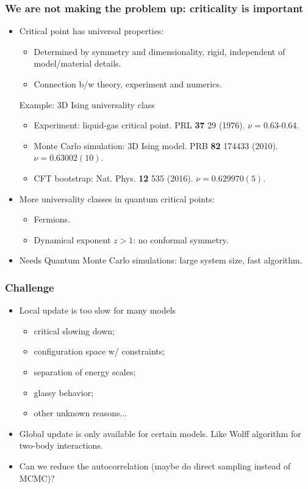 \documentclass[xcolor=table, 10pt, aspectratio=169, ignorenonframetext]{beamer}
\begin{document}
\begin{frame}
  \frametitle{We are not making the problem up: criticality is important}
  \begin{itemize}
  \item Critical point has universal properties:
    \begin{itemize}
    \item Determined by symmetry and dimensionality, rigid, independent of model/material details.
    \item Connection b/w theory, experiment and numerics.
    \end{itemize}
    \begin{block}{Example: 3D Ising universality class}
      \begin{itemize}
      \item Experiment: liquid-gas critical point. PRL \textbf{37} 29 (1976). $\nu=$0.63-0.64.
      \item Monte Carlo simulation: 3D Ising model. PRB \textbf{82} 174433 (2010). $\nu=0.63002(10)$.
      \item CFT bootstrap: Nat. Phys. \textbf{12} 535 (2016). $\nu=0.629970(5)$.
      \end{itemize}
    \end{block}
  \item More universality classes in quantum critical points:
    \begin{itemize}
    \item Fermions.
    \item Dynamical exponent $z>1$: no conformal symmetry.
    \end{itemize}
  \item Needs Quantum Monte Carlo simulations: large system size, fast algorithm.
  \end{itemize}
\end{frame}

\begin{frame}
  \frametitle{Challenge}
  \begin{itemize}
  \item Local update is too slow for many models
    \begin{itemize}
    \item critical slowing down;
    \item configuration space w/ constraints;
    \item separation of energy scales;
    \item glassy behavior;
    \item other unknown reasons...
    \end{itemize}
    \item Global update is only available for certain models. Like Wolff algorithm for two-body interactions.
    \item Can we reduce the autocorrelation (maybe do direct sampling instead of MCMC)?
  \end{itemize}
\end{frame}
\end{document}
